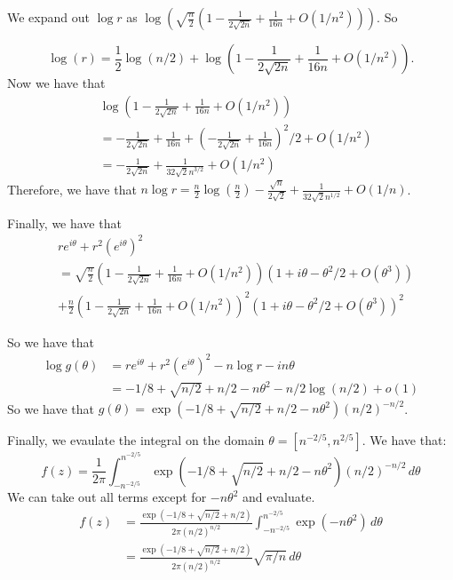 \documentclass[]{article}
\begin{document}
We expand out $\log r$ as $\log(\sqrt{\frac{n}{2}} \left(1 - \frac{1}{2 \sqrt{2n}} + \frac{1}{16n} + O(1/n^2)\right))$. So

\begin{equation}
	\log(r) = \frac{1}{2}\log(n/2) + \log\left(1 - \frac{1}{2 \sqrt{2n}} + \frac{1}{16n} + O(1/n^2)\right).
\end{equation} 
Now we have that 
\begin{align*}
	&\log\left(1 - \frac{1}{2 \sqrt{2n}} + \frac{1}{16n} + O(1/n^2)\right) \\
	&= - \frac{1}{2 \sqrt{2n}} + \frac{1}{16n} + (- \frac{1}{2 \sqrt{2n}} + \frac{1}{16n})^2/2 + O(1/n^2)\\
	&= -\frac{1}{2 \sqrt{2n}} + \frac{1}{32 \sqrt{2}n^{3/2}} + O(1/n^2)
\end{align*}
Therefore, we have that $n \log r = \frac{n}{2}\log \left(\frac{n}{2}\right) - \frac{\sqrt{n}}{2 \sqrt{2}} + \frac{1}{32 \sqrt{2} n^{1/2}} + O(1/n)$. 

Finally, we have that
\begin{align*}
	 &r e^{i \theta} + r^2 (e^{i \theta})^2 \\
	 &= \sqrt{\frac{n}{2}} \left(1 - \frac{1}{2 \sqrt{2n}} + \frac{1}{16n} + O(1/n^2)\right)( 1 + i \theta - \theta^2/2 + O(\theta^3)) \\
	 &+ \frac{n}{2} \left(1 - \frac{1}{2 \sqrt{2n}} + \frac{1}{16n} + O(1/n^2)\right)^2( 1 + i \theta - \theta^2/2 + O(\theta^3))^2
\end{align*}

So we have that 
\begin{align}
	\log g(\theta) &=r e^{i \theta} + r^2 (e^{i \theta})^2 - n \log r - i n \theta \\
	&=
	-1/8 + \sqrt{n/2} + n/2 - n \theta^2 -n/2 \log(n/2) + o(1) 
\end{align}
So we have that $g(\theta) = \exp(-1/8 + \sqrt{n/2} + n/2 - n\theta^2)(n/2)^{-n/2}$. 

Finally, we evaulate the integral on the domain $\theta = [n^{-2/5}, n^{2/5}]$. We have that:
\begin{equation}
	[z^n] f(z) = \frac{1}{2 \pi} \int_{-n^{-2/5}}^{n^{-2/5}} \exp(-1/8 + \sqrt{n/2} + n/2 - n\theta^2) (n/2)^{-n/2}\, d\theta
\end{equation}
We can take out all terms except for $-n \theta^2$ and evaluate. 
\begin{align*}
	[z^n] f(z) &= \frac{\exp(-1/8 + \sqrt{n/2} + n/2) }{2 \pi(n/2)^{n/2}} \int_{-n^{-2/5}}^{n^{-2/5}} \exp(- n\theta^2)\, d\theta\\
	&=
	 \frac{\exp(-1/8 + \sqrt{n/2} + n/2)}{2 \pi(n/2)^{n/2}} \sqrt{\pi/n}\, d\theta \\
\end{align*}
\end{document}
